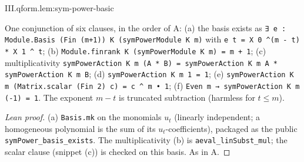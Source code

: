 \begin{lemma}
\end{lemma}
\begin{tfformal}{III.qform.lem:sym-power-basic}
\begin{tffidelity}
One conjunction of six clauses, in the order of A: (a) the basis exists as \texttt{∃ e : Module.Basis (Fin (m+1)) K (symPowerModule K m)} with \texttt{e t = X 0 \^{}(m - t) * X 1 \^{} t}; (b) \texttt{Module.finrank K (symPowerModule K m) = m + 1}; (c) multiplicativity \texttt{symPowerAction K m (A * B) = symPowerAction K m A * symPowerAction K m B}; (d) \texttt{symPowerAction K m 1 = 1}; (e) \texttt{symPowerAction K m (Matrix.scalar (Fin 2) c) = c \^{} m • 1}; (f) \texttt{Even m → symPowerAction K m (-1) = 1}. The exponent $m-t$ is truncated subtraction (harmless for $t\le m$).
\end{tffidelity}
\end{tfformal}
\begin{proof}[Lean proof]
(a) \texttt{Basis.mk} on the monomials $u_t$ (linearly independent; a homogeneous polynomial is the sum of its $u_t$-coefficients), packaged as the public \texttt{symPower\_basis\_exists}. The multiplicativity (b) is \texttt{aeval\_linSubst\_mul}; the scalar clause (snippet (c)) is checked on this basis. As in A.
\end{proof}

